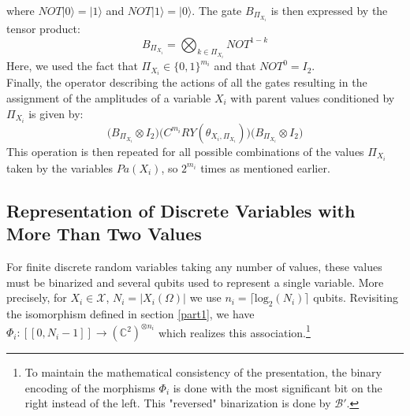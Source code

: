 where $NOT|0\rangle = |1\rangle$ and $NOT|1\rangle = |0\rangle$. 
The gate $B_{\Pi_{X_i}}$ is then expressed by the tensor product:
\[B_{\Pi_{X_i}} = \bigotimes_{k \in \Pi_{X_i}} NOT^{1-k} \]
Here, we used the fact that $\Pi_{X_i} \in \{0,1\}^{m_i}$ and that $NOT^0 = I_2$. 
\\
Finally, the operator describing the actions of all the gates resulting in the assignment of the amplitudes of a variable $X_i$ with parent values conditioned by $\Pi_{X_i}$ is given by: 
\[
\big(B_{\Pi_{X_i}} \!\! \otimes I_2 \big)
\big(C^{m_i}RY(\theta_{X_i, \Pi_{X_i}})\big)
\big(B_{\Pi_{X_i}} \!\! \otimes I_2 \big)
\]
This operation is then repeated for all possible combinations of the values $\Pi_{X_i}$ taken by the variables $Pa(X_i)$, so $2^{m_i}$ times as mentioned earlier.

\subsection{Representation of Discrete Variables with More Than Two Values}
\label{QBNgeneral}
For finite discrete random variables taking any number of values, these values must be binarized and several qubits used to represent a single variable. More precisely, for $X_i \in \mathcal{X}$, $N_i = |X_i(\Omega)|$ we use $n_i = \lceil \mathrm{log}_2(N_i) \rceil$ qubits. Revisiting the isomorphism defined in section \ref{part1}, we have $\Phi_i:[\![0,N_i-1]\!] \rightarrow (\mathbb{C}^2)^{\otimes n_i}$ which realizes this association.\footnote{To maintain the mathematical consistency of the presentation, the binary encoding of the morphisms $\Phi_i$ is done with the most significant bit on the right instead of the left. This "reversed" binarization is done by $\mathscr{B}'$. }

